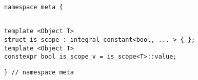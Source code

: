 
\begin{verbatim}
namespace meta {
\end{verbatim}
\begin{verbatim}

template <Object T>
struct is_scope : integral_constant<bool, ... > { };
template <Object T>
constexpr bool is_scope_v = is_scope<T>::value;

\end{verbatim}
\begin{verbatim}
} // namespace meta
\end{verbatim}

